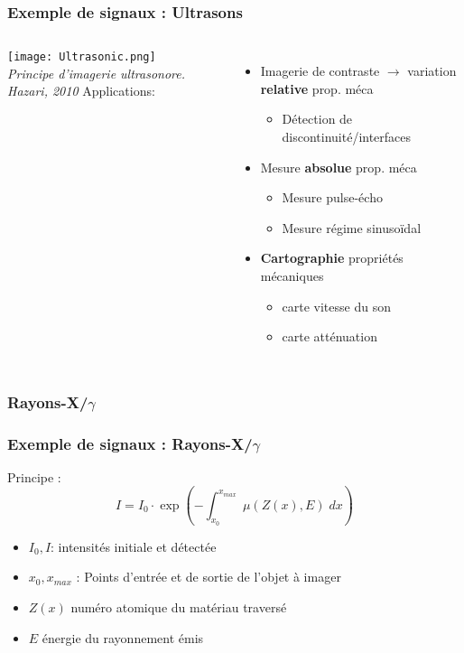 \documentclass{beamer}
\begin{document}
\begin{frame}
\frametitle{Exemple de signaux : Ultrasons}
\begin{columns}
\column{60mm}
\texttt{[image: Ultrasonic.png]}\\
\textit{\footnotesize Principe d'imagerie ultrasonore. Hazari, 2010}
\column{60mm}
Applications:
\begin{itemize}
\item Imagerie de contraste $\rightarrow$ variation \textbf{relative} prop. méca\\
\begin{itemize}
\item Détection de discontinuité/interfaces 
\end{itemize}
\vspace{0.2cm}
\item Mesure \textbf{absolue} prop. méca 
\begin{itemize}
\item Mesure pulse-écho  
\item Mesure régime sinusoïdal
\end{itemize}
\vspace{0.2cm}
\item \textbf{Cartographie} propriétés mécaniques
\begin{itemize}
\item carte vitesse du son 
\item carte atténuation
\end{itemize}
\end{itemize}
\end{columns}
\end{frame}

\subsubsection{Rayons-X/$\gamma$}
\begin{frame}
\frametitle{Exemple de signaux : Rayons-X/$\gamma$}
Principe :
\[  I = I_0 \cdot \exp (- \int^{x_{max}}_{x_0} \; \mu (Z(x),E) \; dx)  \] 
\vspace{0.5cm}
\begin{itemize}
\item $I_0, I$: intensités initiale et détectée 
\item $x_0, x_{max}$ : Points d'entrée et de sortie de l'objet à imager
\item $Z(x)$  numéro atomique du matériau traversé 
\item $E$ énergie du rayonnement émis
\end{itemize}
\vspace{0.5cm}
\end{frame}
\end{document}
